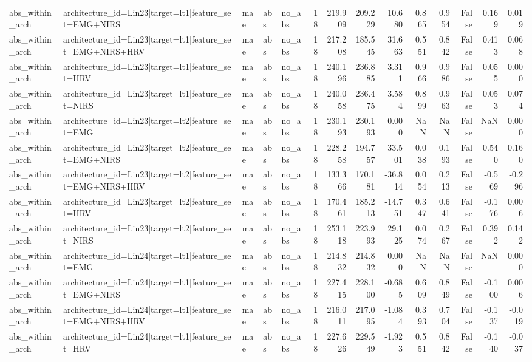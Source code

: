 \begin{table}
\begin{tabular}{lllllrrrrrrrrr}
abs_within_arch & architecture_id=Lin23|target=lt1|feature_set=EMG+NIRS & mae & abs & no_abs & 18 & 219.909 & 209.229 & 10.680 & 0.865 & 0.954 & False & 0.169 & 0.019 \\
abs_within_arch & architecture_id=Lin23|target=lt1|feature_set=EMG+NIRS+HRV & mae & abs & no_abs & 18 & 217.208 & 185.545 & 31.663 & 0.551 & 0.842 & False & 0.413 & 0.068 \\
abs_within_arch & architecture_id=Lin23|target=lt1|feature_set=HRV & mae & abs & no_abs & 18 & 240.196 & 236.885 & 3.311 & 0.966 & 0.986 & False & 0.055 & 0.000 \\
abs_within_arch & architecture_id=Lin23|target=lt1|feature_set=NIRS & mae & abs & no_abs & 18 & 240.058 & 236.475 & 3.584 & 0.899 & 0.963 & False & 0.053 & 0.074 \\
abs_within_arch & architecture_id=Lin23|target=lt2|feature_set=EMG & mae & abs & no_abs & 18 & 230.193 & 230.193 & 0.000 & NaN & NaN & False & NaN & 0.000 \\
abs_within_arch & architecture_id=Lin23|target=lt2|feature_set=EMG+NIRS & mae & abs & no_abs & 18 & 228.258 & 194.757 & 33.501 & 0.038 & 0.193 & False & 0.540 & 0.160 \\
abs_within_arch & architecture_id=Lin23|target=lt2|feature_set=EMG+NIRS+HRV & mae & abs & no_abs & 18 & 133.366 & 170.181 & -36.814 & 0.054 & 0.213 & False & -0.569 & -0.296 \\
abs_within_arch & architecture_id=Lin23|target=lt2|feature_set=HRV & mae & abs & no_abs & 18 & 170.461 & 185.213 & -14.751 & 0.347 & 0.641 & False & -0.176 & 0.006 \\
abs_within_arch & architecture_id=Lin23|target=lt2|feature_set=NIRS & mae & abs & no_abs & 18 & 253.118 & 223.993 & 29.125 & 0.074 & 0.267 & False & 0.392 & 0.142 \\
abs_within_arch & architecture_id=Lin24|target=lt1|feature_set=EMG & mae & abs & no_abs & 18 & 214.832 & 214.832 & 0.000 & NaN & NaN & False & NaN & 0.000 \\
abs_within_arch & architecture_id=Lin24|target=lt1|feature_set=EMG+NIRS & mae & abs & no_abs & 18 & 227.415 & 228.100 & -0.685 & 0.609 & 0.849 & False & -0.100 & 0.006 \\
abs_within_arch & architecture_id=Lin24|target=lt1|feature_set=EMG+NIRS+HRV & mae & abs & no_abs & 18 & 216.011 & 217.095 & -1.084 & 0.393 & 0.704 & False & -0.137 & -0.019 \\
abs_within_arch & architecture_id=Lin24|target=lt1|feature_set=HRV & mae & abs & no_abs & 18 & 227.626 & 229.549 & -1.923 & 0.551 & 0.842 & False & -0.140 & -0.037 \\

\end{tabular}
\end{table}
